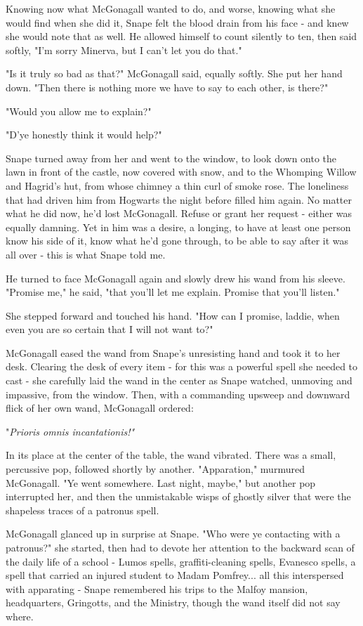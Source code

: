 Knowing now what McGonagall wanted to do, and worse, knowing what she would find when she did it, Snape felt the blood drain from his face - and knew she would note that as well. He allowed himself to count silently to ten, then said softly, "I'm sorry Minerva, but I can't let you do that."

"Is it truly so bad as that?" McGonagall said, equally softly. She put her hand down. "Then there is nothing more we have to say to each other, is there?"

"Would you allow me to explain?"

"D'ye honestly think it would help?"

Snape turned away from her and went to the window, to look down onto the lawn in front of the castle, now covered with snow, and to the Whomping Willow and Hagrid's hut, from whose chimney a thin curl of smoke rose. The loneliness that had driven him from Hogwarts the night before filled him again. No matter what he did now, he'd lost McGonagall. Refuse or grant her request - either was equally damning. Yet in him was a desire, a longing, to have at least one person know his side of it, know what he'd gone through, to be able to say after it was all over - this is what Snape told me.

He turned to face McGonagall again and slowly drew his wand from his sleeve. "Promise me," he said, "that you'll let me explain. Promise that you'll listen."

She stepped forward and touched his hand. "How can I promise, laddie, when even you are so certain that I will not want to?"

McGonagall eased the wand from Snape's unresisting hand and took it to her desk. Clearing the desk of every item - for this was a powerful spell she needed to cast - she carefully laid the wand in the center as Snape watched, unmoving and impassive, from the window. Then, with a commanding upsweep and downward flick of her own wand, McGonagall ordered:

"\emph{Prioris omnis incantationis!"}

In its place at the center of the table, the wand vibrated. There was a small, percussive pop, followed shortly by another. "Apparation," murmured McGonagall. "Ye went somewhere. Last night, maybe," but another pop interrupted her, and then the unmistakable wisps of ghostly silver that were the shapeless traces of a patronus spell.

McGonagall glanced up in surprise at Snape. "Who were ye contacting with a patronus?" she started, then had to devote her attention to the backward scan of the daily life of a school - Lumos spells, graffiti-cleaning spells, Evanesco spells, a spell that carried an injured student to Madam Pomfrey... all this interspersed with apparating - Snape remembered his trips to the Malfoy mansion, headquarters, Gringotts, and the Ministry, though the wand itself did not say where.

